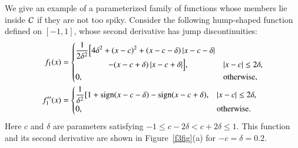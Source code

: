 \documentclass[review]{elsarticle}
\theoremstyle{definition}
\DeclareMathOperator{\ninit}{ninit}
\begin{document}
We give an example of a parameterized family of functions whose members lie
inside $\mathcal{C}$ if they are not too spiky.
%
Consider the following hump-shaped function defined on $[-1,1]$, whose
second derivative has jump discontinuities:
\begin{align} \label{f3def}
f_1(x) & = \begin{cases} \displaystyle
   \frac{1}{2\delta^2} \Bigl [4 \delta^2 + (x-c)^2 + (x-c-\delta)\left \lvert x-c-\delta \right \rvert
\\ \qquad \qquad
    - (x-c+\delta)\left \lvert x-c+\delta \right \rvert \Bigr ], & \left \lvert x-c \right \rvert \le 2\delta,
\\ 0, & \text{otherwise},
\end{cases} 
\\ \nonumber
f''_1(x) & =
\begin{cases} \displaystyle
    \frac{1}{\delta^2} [1 + \operatorname{sign}(x-c-\delta) - \operatorname{sign}(x-c+\delta), & \left \lvert x-c \right \rvert \le 2\delta,
\\ 0, & \text{otherwise}.
\end{cases}
\end{align}
Here $c$ and $\delta$ are parameters satisfying $-1 \le c-2 \delta < c+ 2\delta
\le 1$. This function and its second derivative are shown in Figure~\ref{f3fig}(a)
for $-c=\delta = 0.2$.
\end{document}
